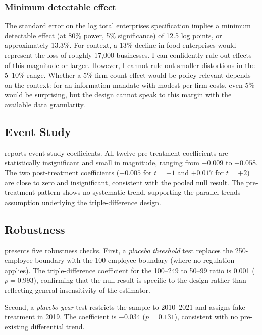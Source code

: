 \documentclass[12pt]{article}
\begin{document}
\subsubsection*{Minimum detectable effect} The standard error on the log total enterprises specification implies a minimum detectable effect (at 80\% power, 5\% significance) of 12.5 log points, or approximately 13.3\%. For context, a 13\% decline in food enterprises would represent the loss of roughly 17,000 businesses. I can confidently rule out effects of this magnitude or larger. However, I cannot rule out smaller distortions in the 5--10\% range. Whether a 5\% firm-count effect would be policy-relevant depends on the context: for an information mandate with modest per-firm costs, even 5\% would be surprising, but the design cannot speak to this margin with the available data granularity.

\subsection{Event Study}

 reports event study coefficients. All twelve pre-treatment coefficients are statistically insignificant and small in magnitude, ranging from $-0.009$ to $+0.058$. The two post-treatment coefficients ($+0.005$ for $t=+1$ and $+0.017$ for $t=+2$) are close to zero and insignificant, consistent with the pooled null result. The pre-treatment pattern shows no systematic trend, supporting the parallel trends assumption underlying the triple-difference design.



\subsection{Robustness}

 presents five robustness checks. First, a \textit{placebo threshold} test replaces the 250-employee boundary with the 100-employee boundary (where no regulation applies). The triple-difference coefficient for the 100--249 to 50--99 ratio is 0.001 ($p = 0.993$), confirming that the null result is specific to the design rather than reflecting general insensitivity of the estimator.



Second, a \textit{placebo year} test restricts the sample to 2010--2021 and assigns fake treatment in 2019. The coefficient is $-0.034$ ($p = 0.131$), consistent with no pre-existing differential trend.
\end{document}
